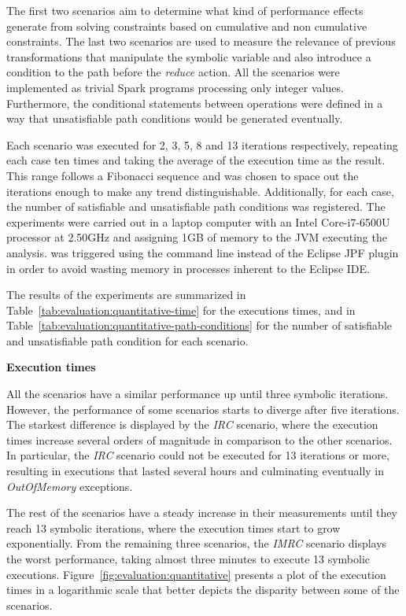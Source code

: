 The first two scenarios aim to determine what kind of performance effects generate from solving constraints based on cumulative and non cumulative constraints. The last two scenarios are used to measure the relevance of previous transformations that manipulate the symbolic variable and also introduce a condition to the path before the \textit{reduce} action. All the scenarios were implemented as trivial Spark programs processing only integer values. Furthermore, the conditional statements between operations were defined in a way that unsatisfiable path conditions would be generated eventually.

Each scenario was executed for 2, 3, 5, 8 and 13 iterations respectively, repeating each case ten times and taking the average of the execution time as the result. This range follows a Fibonacci sequence and was chosen to space out the iterations enough to make any trend distinguishable. Additionally, for each case, the number of satisfiable and unsatisfiable path conditions was registered. The experiments were carried out in a laptop computer with an Intel Core-i7-6500U processor at 2.50GHz and assigning 1GB of memory to the JVM executing the analysis. \jpf{} was triggered using the command line instead of the Eclipse JPF plugin in order to avoid wasting memory in processes inherent to the Eclipse IDE.


The results of the experiments are summarized in Table~\ref{tab:evaluation:quantitative-time} for the executions times, and in Table~\ref{tab:evaluation:quantitative-path-conditions} for the number of satisfiable and unsatisfiable path condition for each scenario.

\textbf{Execution times}

All the scenarios have a similar performance up until three symbolic iterations. However, the performance of some scenarios starts to diverge after five iterations. The starkest difference is displayed by the \textit{IRC} scenario, where the execution times increase several orders of magnitude in comparison to the other scenarios. In particular, the \textit{IRC} scenario could not be executed for 13 iterations or more, resulting in executions that lasted several hours and culminating eventually in \textit{OutOfMemory} exceptions.

The rest of the scenarios have a steady increase in their measurements until they reach 13 symbolic iterations, where the execution times start to grow exponentially. From the remaining three scenarios, the \textit{IMRC} scenario displays the worst performance, taking almost three minutes to execute 13 symbolic executions. Figure~\ref{fig:evaluation:quantitative} presents a plot of the execution times in a logarithmic scale that better depicts the disparity between some of the scenarios.

